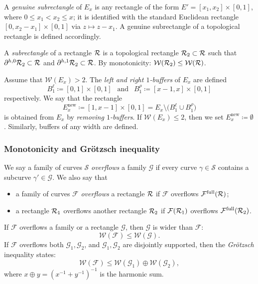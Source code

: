\documentclass{amsart}
\newcommand\full{{\operatorname{full}}}
\renewcommand{\sp}{{\ \ }}
\newcommand{\1}{{\mathbb 1 }}
\renewcommand{\SS}{{\mathcal S}}
\newcommand{\Fam}{{\mathcal F}}
\newcommand{\FamG}{{\mathcal G}}
\newcommand{\Width}{{\mathcal W}}
\newcommand\new{{\operatorname{new}}}
\begin{document}
A \emph{genuine subrectangle} of $E_x$ is any rectangle of the form $E'=[x_1,x_2]\times [0,1]$, where $0\le x_1<x_2\le x$; it is identified with the standard Euclidean rectangle $[0,x_2-x_1]\times [0,1]$ via $z\mapsto z- x_1$. A genuine subrectangle of a topological rectangle is defined accordingly. 

A \emph{subrectangle} of a rectangle ${\mathcal R}$ is a topological rectangle ${\mathcal R}_2\subset {\mathcal R}$ such that $\partial^{h,0}{\mathcal R}_2\subset {\mathcal R}$ and $\partial^{h,1}{\mathcal R}_2\subset {\mathcal R}$. By monotonicity: $\Width(\RR_2)\le \Width(\RR)$.


Assume that $\Width(E_x)>2$. The \emph{left and right $1$-buffers} of $E_x$ are defined \[ B^\ell_1\coloneqq [0,1]\times [0,1]\sp\text{ and }\sp B^\rho_1\coloneqq [x-1,x]\times [0,1]\] respectively. We say that the rectangle 
\[E^\new_x\coloneqq [1,x-1]\times [0,1]=E_x\setminus \big( B^\ell_1 \cup B^\rho_1\big)\] is obtained from $E_x$ by \emph{removing $1$-buffers}. If $\Width(E_x)\le 2$, then we set $E_x^\new\coloneqq\emptyset$. Similarly, buffers of any width are defined.


\subsubsection{Monotonicity and Gr\"otzsch inequality} \label{sss:Monot+Gr}We say a family of curves $\SS$ \emph{overflows} a family $\FamG$ if every curve $\gamma\in\SS$ contains a subcurve $\gamma'\in \FamG$. We also say that 
\begin{itemize}
\item a family of curves $\Fam$ \emph{overflows} a rectangle ${\mathcal R}$ if $\Fam$ overflows $\Fam^\full(\RR)$;
\item a rectangle ${\mathcal R}_1$ overflows another rectangle ${\mathcal R}_2$ if $\Fam(\RR_1)$ overflows $\Fam^\full(\RR_2)$.
\end{itemize}
 
 

If $\Fam$ overflows a family or a rectangle $\FamG$, then $\FamG$ is wider than $\Fam$:
\begin{equation}
\label{eq:Width Monot}
\Width(\Fam) \le \Width(\FamG).
\end{equation}
If $\Fam$ overflows both $\FamG_1,\FamG_2$, and $\FamG_1,\FamG_2$ are disjointly supported, then the \emph{Gr\"otzsch} inequality states:
\begin{equation}
\label{eq:Grot}
\Width(\Fam) \le \Width(\FamG_1)\oplus \Width(\FamG_2),
\end{equation}
where $x\oplus y =(x^{-1}+y^{-1})^{-1}$ is the harmonic sum. 
\end{document}
